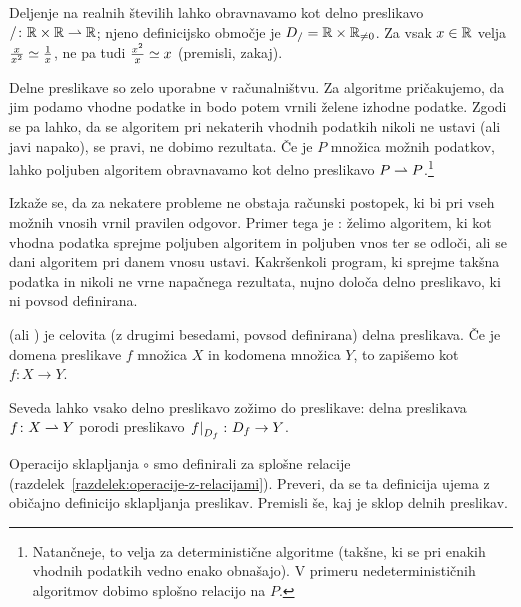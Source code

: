                 \begin{zgled}
                        Deljenje na realnih številih lahko obravnavamo kot delno preslikavo $/\colon \mathbb{R} \times \mathbb{R} \mathrel{\rightharpoonup} \mathbb{R}$; njeno definicijsko območje je $D_{/} = \mathbb{R} \times \mathbb{R}_{\neq 0}$. Za vsak $x \in \mathbb{R}$ velja $\frac{x}{x^2} \simeq \frac{1}{x}$, ne pa tudi $\frac{x^2}{x} \simeq x$ (premisli, zakaj).
                \end{zgled}

                \begin{zgled}
                        Delne preslikave so zelo uporabne v računalništvu. Za algoritme pričakujemo, da jim podamo vhodne podatke in bodo potem vrnili želene izhodne podatke. Zgodi se pa lahko, da se algoritem pri nekaterih vhodnih podatkih nikoli ne ustavi (ali javi napako), se pravi, ne dobimo rezultata. Če je $P$ množica možnih podatkov, lahko poljuben algoritem obravnavamo kot delno preslikavo $P \mathrel{\rightharpoonup} P$.\footnote{Natančneje, to velja za deterministične algoritme (takšne, ki se pri enakih vhodnih podatkih vedno enako obnašajo). V primeru nedeterminističnih algoritmov dobimo splošno relacijo na $P$.}

                        Izkaže se, da za nekatere probleme ne obstaja računski postopek, ki bi pri vseh možnih vnosih vrnil pravilen odgovor. Primer tega je : želimo algoritem, ki kot vhodna podatka sprejme poljuben algoritem in poljuben vnos ter se odloči, ali se dani algoritem pri danem vnosu ustavi. Kakršenkoli program, ki sprejme takšna podatka in nikoli ne vrne napačnega rezultata, nujno določa delno preslikavo, ki ni povsod definirana. 
                \end{zgled}

                \begin{definicija}
                         (ali ) je celovita (z drugimi besedami, povsod definirana) delna preslikava. Če je domena preslikave $f$ množica $X$ in kodomena množica $Y$, to zapišemo kot $f\colon X \to Y$.
                \end{definicija}

                Seveda lahko vsako delno preslikavo zožimo do preslikave: delna preslikava $f\colon X \mathrel{\rightharpoonup} Y$ porodi preslikavo $\left.{f}\right|_{D_{f}}\colon D_{f} \to Y$.

                \begin{vaja}
                        Operacijo sklapljanja $\circ$ smo definirali za splošne relacije (razdelek~\ref{razdelek:operacije-z-relacijami}). Preveri, da se ta definicija ujema z običajno definicijo sklapljanja preslikav. Premisli še, kaj je sklop delnih preslikav.
                \end{vaja}


